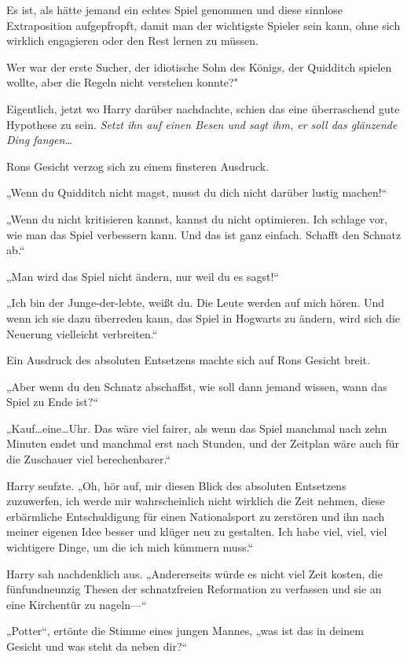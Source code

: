 {Es ist, als hätte jemand ein echtes Spiel genommen und diese sinnlose Extraposition aufgepfropft, damit man der wichtigste Spieler sein kann, ohne sich wirklich engagieren oder den Rest lernen zu müssen.

Wer war der erste Sucher, der idiotische Sohn des Königs, der Quidditch spielen wollte, aber die Regeln nicht verstehen konnte?"

Eigentlich, jetzt wo Harry darüber nachdachte, schien das eine überraschend gute Hypothese zu sein. \emph{Setzt ihn auf einen Besen und sagt ihm, er soll das glänzende Ding fangen…}

Rons Gesicht verzog sich zu einem finsteren Ausdruck.

„Wenn du Quidditch nicht magst, musst du dich nicht darüber lustig machen!“

„Wenn du nicht kritisieren kannst, kannst du nicht optimieren. Ich schlage vor, wie man das Spiel verbessern kann. Und das ist ganz einfach. Schafft den Schnatz ab.“

„Man wird das Spiel nicht ändern, nur weil du es sagst!“

„Ich bin der Junge-der-lebte, weißt du. Die Leute werden auf mich hören. Und wenn ich sie dazu überreden kann, das Spiel in Hogwarts zu ändern, wird sich die Neuerung vielleicht verbreiten.“

Ein Ausdruck des absoluten Entsetzens machte sich auf Rons Gesicht breit.

„Aber wenn du den Schnatz abschaffst, wie soll dann jemand wissen, wann das Spiel zu Ende ist?“

„Kauf…eine…Uhr. Das wäre viel fairer, als wenn das Spiel manchmal nach zehn Minuten endet und manchmal erst nach Stunden, und der Zeitplan wäre auch für die Zuschauer viel berechenbarer.“

Harry seufzte. „Oh, hör auf, mir diesen Blick des absoluten Entsetzens zuzuwerfen, ich werde mir wahrscheinlich nicht wirklich die Zeit nehmen, diese erbärmliche Entschuldigung für einen Nationalsport zu zerstören und ihn nach meiner eigenen Idee besser und klüger neu zu gestalten. Ich habe viel, viel, viel wichtigere Dinge, um die ich mich kümmern muss.“

Harry sah nachdenklich aus. „Andererseits würde es nicht viel Zeit kosten, die fünfundneunzig Thesen der schnatzfreien Reformation zu verfassen und sie an eine Kirchentür zu nageln—“

„Potter“, ertönte die Stimme eines jungen Mannes, „was ist das in deinem Gesicht und was steht da neben dir?“

}

